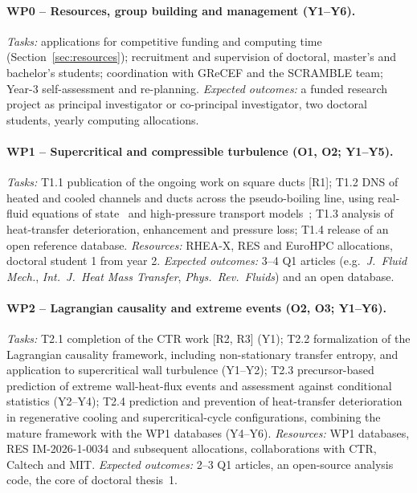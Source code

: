 \documentclass[11pt]{article}
\begin{document}
\paragraph{WP0 -- Resources, group building and management (Y1--Y6).}
\emph{Tasks:} applications for competitive funding and computing time
(Section~\ref{sec:resources}); recruitment and supervision of doctoral, master's and
bachelor's students; coordination with GReCEF and the SCRAMBLE team; Year-3
self-assessment and re-planning.
\emph{Expected outcomes:} a funded research project as principal investigator or
co-principal investigator, two doctoral students, yearly computing allocations.

\paragraph{WP1 -- Supercritical and compressible turbulence (O1, O2; Y1--Y5).}
\emph{Tasks:} T1.1 publication of the ongoing work on square ducts [R1]; T1.2 DNS of heated
and cooled channels and ducts across the pseudo-boiling line, using real-fluid equations
of state~\cite{PengRobinson1976} and high-pressure transport models~\cite{Chung1988};
T1.3 analysis of heat-transfer deterioration, enhancement and pressure loss; T1.4
release of an open reference database.
\emph{Resources:} RHEA-X, RES and EuroHPC allocations, doctoral student 1 from year 2.
\emph{Expected outcomes:} 3--4 Q1 articles (e.g.\ \emph{J.\ Fluid Mech.}, \emph{Int.\ J.\
Heat Mass Transfer}, \emph{Phys.\ Rev.\ Fluids}) and an open database.

\paragraph{WP2 -- Lagrangian causality and extreme events (O2, O3; Y1--Y6).}
\emph{Tasks:} T2.1 completion of the CTR work [R2, R3] (Y1); T2.2 formalization of the
Lagrangian causality framework, including non-stationary transfer entropy, and application
to supercritical wall turbulence (Y1--Y2); T2.3 precursor-based prediction of extreme
wall-heat-flux events and assessment against conditional statistics (Y2--Y4); T2.4
prediction and prevention of heat-transfer deterioration in regenerative cooling and
supercritical-cycle configurations, combining the mature framework with the WP1 databases
(Y4--Y6).
\emph{Resources:} WP1 databases, RES IM-2026-1-0034 and subsequent allocations,
collaborations with CTR, Caltech and MIT.
\emph{Expected outcomes:} 2--3 Q1 articles, an open-source analysis code, the core of
doctoral thesis~1.
\end{document}
